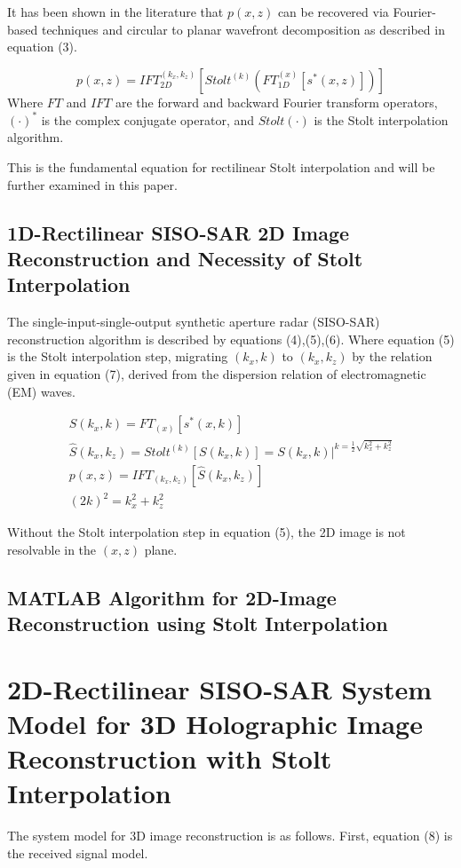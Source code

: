 \documentclass{IEEEtran}
\begin{document}
It has been shown in the literature that $p(x,z)$ can be recovered via Fourier-based techniques and circular to planar wavefront decomposition as described in equation (3).

\begin{equation}
	p(x,z) = IFT^{(k_x,k_z)}_{2D} \left[ Stolt^{(k)} \left( FT^{(x)}_{1D} \left[ s^*(x,z) \right] \right) \right]
\end{equation}
Where $FT$ and $IFT$ are the forward and backward Fourier transform operators, $(\cdot)^*$ is the complex conjugate operator, and $Stolt(\cdot)$ is the Stolt interpolation algorithm.

This is the fundamental equation for rectilinear Stolt interpolation and will be further examined in this paper.

\subsection{1D-Rectilinear SISO-SAR 2D Image Reconstruction and Necessity of Stolt Interpolation}
The single-input-single-output synthetic aperture radar (SISO-SAR) reconstruction algorithm is described by equations (4),(5),(6). Where equation (5) is the Stolt interpolation step, migrating $(k_x,k)$ to $(k_x,k_z)$ by the relation given in equation (7), derived from the dispersion relation of electromagnetic (EM) waves.

\begin{gather}
	S(k_x,k) = FT_{(x)}[s^*(x,k)] \\
	\hat{S}(k_x,k_z) = Stolt^{(k)}[S(k_x,k)] = S(k_x,k)\biggr\rvert^{k = \frac{1}{2} \sqrt{k_x^2 + k_z^2}} \\
	p(x,z) = IFT_{(k_x,k_z)}[\hat{S}(k_x,k_z)]\\
	(2k)^2 = k_x^2 + k_z^2
\end{gather}

Without the Stolt interpolation step in equation (5), the 2D image is not resolvable in the $(x,z)$ plane.

\subsection{MATLAB Algorithm for 2D-Image Reconstruction using Stolt Interpolation}



\section{2D-Rectilinear SISO-SAR System Model for 3D Holographic Image Reconstruction with Stolt Interpolation}
The system model for 3D image reconstruction is as follows. First, equation (8) is the received signal model.
\end{document}
